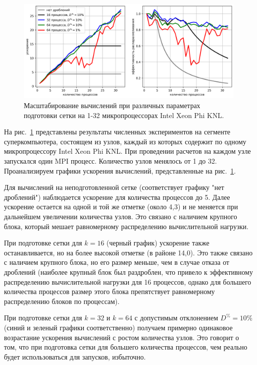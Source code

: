 \begin{figure}[ht]
\centering
\includegraphics[width=1.0\textwidth]{fig/par_scaling3.png}
\singlespacing
{}\caption{Масштабирование вычислений при различных параметрах подготовки сетки на 1-32 микропроцессорах Intel Xeon Phi KNL.}
\label{fig:text_2_withcut_scaling3}
\end{figure}

На рис.~\ref{fig:text_2_withcut_scaling3} представлены результаты численных экспериментов на сегменте суперкомпьютера, состоящем из узлов, каждый из которых содержит по одному микропроцессору Intel Xeon Phi KNL.
При проведении расчетов на каждом узле запускался один MPI\label{abbr:mpi-4} процесс.
Количество узлов менялось от 1 до 32.
Проанализируем графики ускорения вычислений, представленные на рис.~\ref{fig:text_2_withcut_scaling3}.

Для вычислений на неподготовленной сетке (соответствует графику "нет дроблений") наблюдается ускорение для количества процессов до 5.
Далее ускорение остается на одной и той же отметке (около 4,3) и не меняется при дальнейшем увеличении количества узлов.
Это связано с наличием крупного блока, который мешает равномерному распределению вычислительной нагрузки.

При подготовке сетки для $k = 16$ (черный график) ускорение также останавливается, но на более высокой отметке (в районе 14,0).
Это также связано с наличием крупного блока, но его размер меньше, чем в случае отказа от дроблений (наиболее крупный блок был раздроблен, что привело к эффективному распределению вычислительной нагрузки для 16 процессов, однако для большего количества процессов размер этого блока препятствует равномерному распределению блоков по процессам).

При подготовке сетки для $k = 32$ и $k = 64$ с допустимым отклонением $D^{\%} = 10\%$ (синий и зеленый графики соответственно) получаем примерно одинаковое возрастание ускорения вычислений с ростом количества узлов.
Это говорит о том, что при подготовка сетки для большего количества процессов, чем реально будет использоваться для запусков, избыточно.

